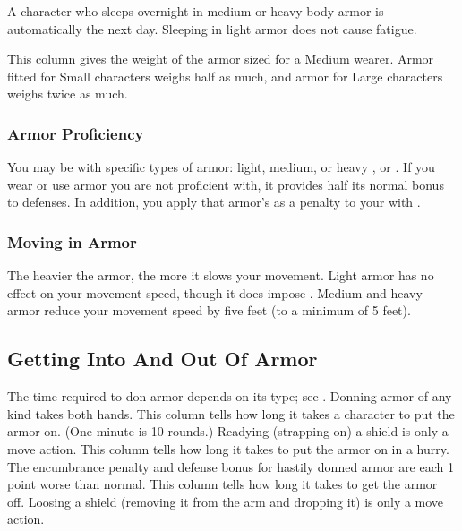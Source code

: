          A character who sleeps overnight in medium or heavy body armor is automatically \fatigued the next day. Sleeping in light armor does not cause fatigue.

         This column gives the weight of the armor sized for a Medium wearer. Armor fitted for Small characters weighs half as much, and armor for Large characters weighs twice as much.

        \subsubsection{Armor Proficiency}\label{Armor Proficiency}
            You may be  with specific types of armor: light, medium, or heavy , or .
            If you wear or use armor you are not proficient with, it provides half its normal bonus to defenses.
            In addition, you apply that armor's  as a penalty to your  with .

        \subsubsection{Moving in Armor}\label{Moving in Armor}
            The heavier the armor, the more it slows your movement. Light armor has no effect on your movement speed, though it does impose . Medium and heavy armor reduce your movement speed by five feet (to a minimum of 5 feet).

    \subsection{Getting Into And Out Of Armor}
        The time required to don armor depends on its type; see . Donning armor of any kind takes both hands.
         This column tells how long it takes a character to put the armor on. (One minute is 10 rounds.) Readying (strapping on) a shield is only a move action.
         This column tells how long it takes to put the armor on in a hurry. The encumbrance penalty and defense bonus for hastily donned armor are each 1 point worse than normal.
         This column tells how long it takes to get the armor off. Loosing a shield (removing it from the arm and dropping it) is only a move action.

